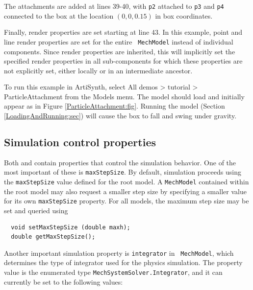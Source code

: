 The attachments are added at lines 39-40, with {\tt p2} attached to
{\tt p3} and {\tt p4} connected to the box at the location $(0, 0,
0.15)$ in box coordinates. 

Finally, render properties are set starting at line 43. In this
example, point and line render properties are set for the entire {\tt
MechModel} instead of individual components.  Since render properties
are inherited, this will implicitly set the specified render
properties in all sub-components for which these properties are not
explicitly set, either locally or in an intermediate ancestor.

To run this example in ArtiSynth, select {\sf All demos > tutorial >
ParticleAttachment} from the {\sf Models} menu. The model should load
and initially appear as in Figure \ref{ParticleAttachment:fig}.
Running the model (Section \ref{LoadingAndRunning:sec}) will cause the
box to fall and swing under gravity.

\subsection{Simulation control properties}

Both  and
 contain properties
that control the simulation behavior. One of the most important of
these is {\tt maxStepSize}. By default, simulation proceeds using the
{\tt maxStepSize} value defined for the root model. A {\tt MechModel}
contained within the root model may also request a smaller step size
by specifying a smaller value for its own {\tt maxStepSize} property.
For all models, the maximum step size may be set and queried
using
%
\begin{lstlisting}
  void setMaxStepSize (double maxh);
  double getMaxStepSize();
\end{lstlisting}
%

Another important simulation property is {\tt integrator} in {\tt
MechModel}, which determines the type of integrator used for the
physics simulation. The property value is the enumerated type
{\tt MechSystemSolver.Integrator}, and it can currently
be set to the following values:


